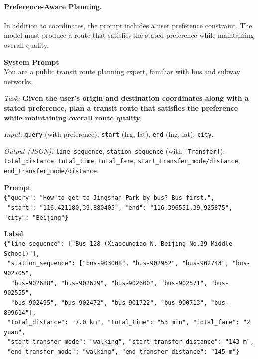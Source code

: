 \documentclass{article}
\begin{document}
\paragraph{Preference-Aware Planning.}
In addition to coordinates, the prompt includes a user preference constraint. The model must produce a route that satisfies the stated preference while maintaining overall quality.
\begin{tcolorbox}[colback=gray!3, colframe=black!40, boxrule=0.4pt, arc=2pt, left=6pt, right=6pt, top=4pt, bottom=4pt, fontupper=\small, fontlower=\small, breakable, title={\small\textbf{Prompt \& Label}}]
\textbf{System Prompt} \\[2pt]
You are a public transit route planning expert, familiar with bus and subway networks.

\textit{Task:} \textbf{Given the user's origin and destination coordinates along with a stated preference, plan a transit route that satisfies the preference while maintaining overall route quality.}

\textit{Input:} \texttt{query} (with preference), \texttt{start} (lng, lat), \texttt{end} (lng, lat), \texttt{city}.

\textit{Output (JSON):} \texttt{line\_sequence}, \texttt{station\_sequence} (with \texttt{[Transfer]}), \texttt{total\_distance}, \texttt{total\_time}, \texttt{total\_fare}, \texttt{start\_transfer\_mode/distance}, \texttt{end\_transfer\_mode/distance}.

\tcblower

\textbf{Prompt} \\[2pt]
\texttt{\{"query": "How to get to Jingshan Park by bus? Bus-first.",} \\
\texttt{~"start": "116.421180,39.880405", "end": "116.396551,39.925875", "city": "Beijing"\}}

\vspace{6pt}
\textbf{Label} \\[2pt]
\texttt{\{"line\_sequence": ["Bus 128 (Xiaocunqiao N.--Beijing No.39 Middle School)"],} \\
\texttt{~"station\_sequence": ["bus-903008", "bus-902952", "bus-902743", "bus-902705",} \\
\texttt{~~"bus-902688", "bus-902629", "bus-902600", "bus-902571", "bus-902555",} \\
\texttt{~~"bus-902495", "bus-902472", "bus-901722", "bus-900713", "bus-899614"],} \\
\texttt{~"total\_distance": "7.0 km", "total\_time": "53 min", "total\_fare": "2 yuan",} \\
\texttt{~"start\_transfer\_mode": "walking", "start\_transfer\_distance": "143 m",} \\
\texttt{~"end\_transfer\_mode": "walking", "end\_transfer\_distance": "145 m"\}}
\end{tcolorbox}
\end{document}
